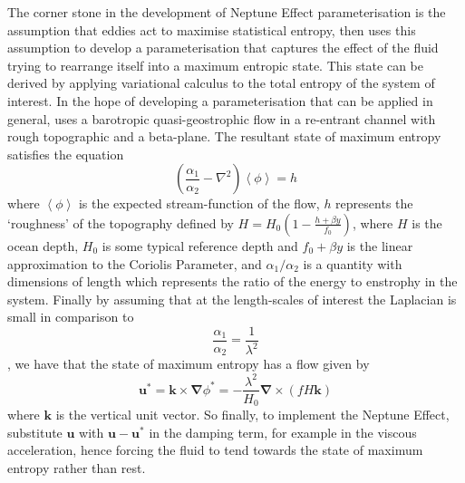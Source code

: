 \documentclass[12pt,a4paper]{report}
\begin{document}
                	The corner stone in the development of Neptune Effect parameterisation is the assumption that eddies act to maximise statistical entropy, \cite{holloway1992representing} then uses this assumption to develop a parameterisation that captures the effect of the fluid trying to rearrange itself into a maximum entropic state. This state can be derived by applying variational calculus to the total entropy of the system of interest. In the hope of developing a parameterisation that can be applied in general, \cite{holloway1992representing} uses a barotropic quasi-geostrophic flow in a re-entrant channel with rough topographic and a beta-plane. The resultant state of maximum entropy satisfies the equation 
                	\begin{equation}
                	\left(\frac{\alpha_{1}}{\alpha_{2}}-\nabla^{2}\right)\left\langle\phi\right\rangle=h
                	\end{equation} 
                	where  $\left\langle\phi\right\rangle$  
                	 is the expected stream-function of the flow, $h$ represents the `roughness' of the topography defined by 
                	  $H=H_{0}\left(1-\frac{h+\beta y}{f_{0}}\right)$, where $H$ is the ocean depth, $H_{0}$ is some typical reference  depth and $f_{0}+\beta y$ is the linear approximation to the Coriolis Parameter, and ${\alpha_{1}}/{\alpha_{2}}$ is a quantity with dimensions of length which represents the ratio of the energy to enstrophy in the system. Finally by assuming that at the length-scales of interest the Laplacian is small in comparison to
                	  \begin{equation*}
                	  \frac{\alpha_{1}}{\alpha_{2}}=\frac{1}{\lambda^{2}}
                	  \end{equation*}, we have that the state of maximum entropy has a flow given by  
                	\begin{equation}
                	\boldsymbol{u}^{\ast}=\boldsymbol{k}\times\boldsymbol{\nabla}\phi^{\ast}=
                	-\frac{\lambda^{2}}{H_{0}}
                	\boldsymbol{\nabla}\times \left(fH\boldsymbol{k}\right)
                	\end{equation}
                	where $\boldsymbol{k}$ is the vertical unit vector.
                	So finally, to implement the Neptune Effect, substitute $\boldsymbol{u}$ with $\boldsymbol{u}-\boldsymbol{u}^{\ast}$ in the
                	 damping term, for example in the viscous acceleration, hence forcing
                	  the fluid to tend towards the state of maximum entropy rather than rest.  
\end{document}

